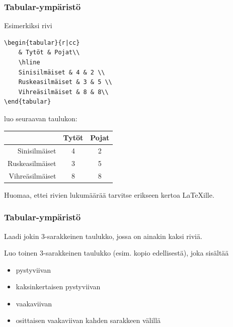 \begin{frame}[fragile]
    \frametitle{Tabular-ympäristö}
    Esimerkiksi rivi
    \begin{scriptsize}
        \begin{Verbatim}[frame=single]
\begin{tabular}{r|cc}
    & Tytöt & Pojat\\
    \hline
    Sinisilmäiset & 4 & 2 \\
    Ruskeasilmäiset & 3 & 5 \\
    Vihreäsilmäiset & 8 & 8\\
\end{tabular}
        \end{Verbatim}
    \end{scriptsize}
    luo seuraavan taulukon:
    \begin{sample} 
        \begin{tabular}{r|cc}
            & Tytöt & Pojat\\
            \hline
            Sinisilmäiset & 4 & 2 \\
            Ruskeasilmäiset & 3 & 5 \\
            Vihreäsilmäiset & 8 & 8\\
        \end{tabular}
    \end{sample}
    Huomaa, ettei rivien lukumäärää tarvitse erikseen kertoa \LaTeX ille.

\end{frame}



\begin{frame}[fragile]
    \frametitle{Tabular-ympäristö}
    \begin{harj}
        Laadi jokin 3-sarakkeinen taulukko, jossa on ainakin kaksi riviä.  
    \end{harj}
    \begin{harj}
        Luo toinen 3-sarakkeinen taulukko (esim. kopio edellisestä), joka sisältää 
        \begin{itemize}
            \item pystyviivan
            \item kaksinkertaisen pystyviivan
            \item vaakaviivan
            \item osittaisen vaakaviivan kahden sarakkeen välillä
        \end{itemize}
    \end{harj}
\end{frame}
